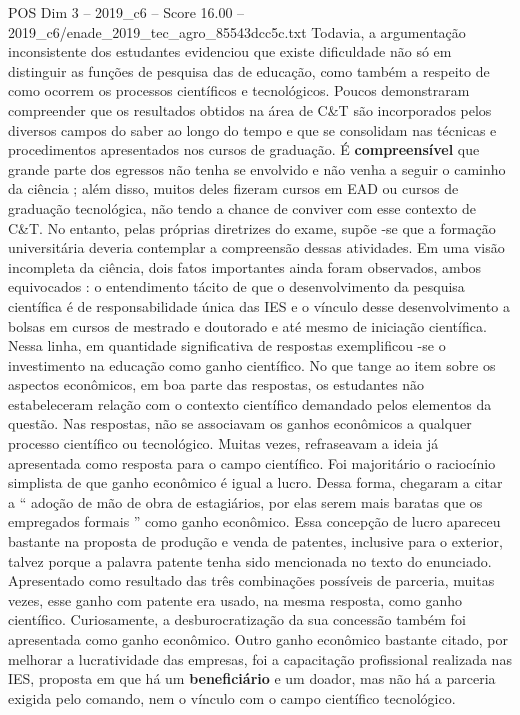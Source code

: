 \begin{textsample}{POS Dim 3 – 2019\_c6 – Score 16.00 – 2019\_c6/enade\_2019\_tec\_agro\_85543dcc5c.txt}
Todavia, a argumentação inconsistente dos estudantes evidenciou que existe dificuldade não só em distinguir as funções de pesquisa das de educação, como também a respeito de como ocorrem os processos científicos e tecnológicos.
Poucos demonstraram compreender que os resultados obtidos na área de C\&T são incorporados pelos diversos campos do saber ao longo do tempo e que se consolidam nas técnicas e procedimentos apresentados nos cursos de graduação.
É \textbf{compreensível} que grande parte dos egressos não tenha se envolvido e não venha a seguir o caminho da ciência ; além disso, muitos deles fizeram cursos em EAD ou cursos de graduação tecnológica, não tendo a chance de conviver com esse contexto de C\&T.
No entanto, pelas próprias diretrizes do exame, supõe -se que a formação universitária deveria contemplar a compreensão dessas atividades.
Em uma visão incompleta da ciência, dois fatos importantes ainda foram observados, ambos equivocados : o entendimento tácito de que o desenvolvimento da pesquisa científica é de responsabilidade única das IES e o vínculo desse desenvolvimento a bolsas em cursos de mestrado e doutorado e até mesmo de iniciação científica.
Nessa linha, em quantidade significativa de respostas exemplificou -se o investimento na educação como ganho científico.
No que tange ao item sobre os aspectos econômicos, em boa parte das respostas, os estudantes não estabeleceram relação com o contexto científico demandado pelos elementos da questão.
Nas respostas, não se associavam os ganhos econômicos a qualquer processo científico ou tecnológico.
Muitas vezes, refraseavam a ideia já apresentada como resposta para o campo científico.
Foi majoritário o raciocínio simplista de que ganho econômico é igual a lucro.
Dessa forma, chegaram a citar a “ adoção de mão de obra de estagiários, por elas serem mais baratas que os empregados formais ” como ganho econômico.
Essa concepção de lucro apareceu bastante na proposta de produção e venda de patentes, inclusive para o exterior, talvez porque a palavra patente tenha sido mencionada no texto do enunciado.
Apresentado como resultado das três combinações possíveis de parceria, muitas vezes, esse ganho com patente era usado, na mesma resposta, como ganho científico.
Curiosamente, a desburocratização da sua concessão também foi apresentada como ganho econômico.
Outro ganho econômico bastante citado, por melhorar a lucratividade das empresas, foi a capacitação profissional realizada nas IES, proposta em que há um \textbf{beneficiário} e um doador, mas não há a parceria exigida pelo comando, nem o vínculo com o campo científico tecnológico.

\end{textsample}
